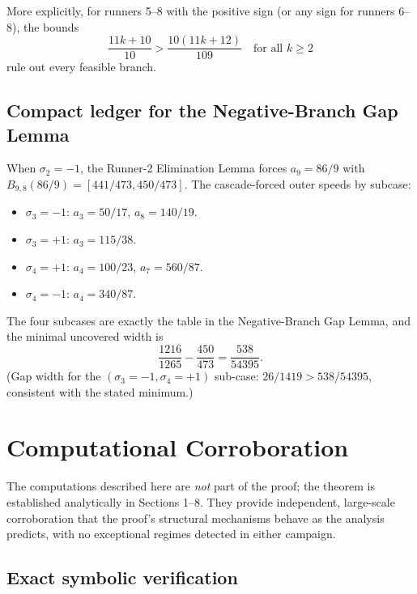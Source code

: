 \documentclass[12pt]{article}
\begin{document}
More explicitly, for runners 5–8 with the positive sign (or any sign for runners 6–8),
the bounds
\[
\frac{11k+10}{10} > \frac{10(11k+12)}{109}\quad\text{for all }k\ge 2
\]
rule out every feasible branch.

\subsection{Compact ledger for the Negative-Branch Gap Lemma}

When $\sigma_2=-1$, the Runner-2 Elimination Lemma forces $a_9=86/9$ with
$B_{9,8}(86/9)=[441/473,450/473]$. The cascade-forced outer speeds by subcase:

\begin{itemize}
\item $\sigma_3=-1$: $a_3=50/17$, $a_8=140/19$.
\item $\sigma_3=+1$: $a_3=115/38$.
\item $\sigma_4=+1$: $a_4=100/23$, $a_7=560/87$.
\item $\sigma_4=-1$: $a_4=340/87$.
\end{itemize}

The four subcases are exactly the table in the Negative-Branch Gap Lemma, and the
minimal uncovered width is
\[
\frac{1216}{1265} - \frac{450}{473} = \frac{538}{54395}.
\]
(Gap width for the $(\sigma_3=-1,\sigma_4=+1)$ sub-case: $26/1419 > 538/54395$,
consistent with the stated minimum.)



\section{Computational Corroboration}

The computations described here are \emph{not} part of the proof; the theorem is
established analytically in Sections 1–8. They provide independent, large-scale
corroboration that the proof's structural mechanisms behave as the analysis predicts,
with no exceptional regimes detected in either campaign.

\subsection{Exact symbolic verification}
\end{document}

